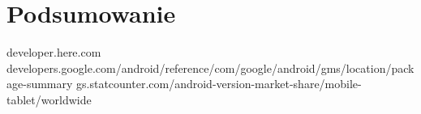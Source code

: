 \documentclass[10pt,twoside,a4paper]{report}
\begin{document}
\chapter{Podsumowanie}

\begin{thebibliography}{1}
   developer.here.com
   developers.google.com/android/reference/com/google/android/gms/location/package-summary
   gs.statcounter.com/android-version-market-share/mobile-tablet/worldwide
\end{thebibliography}

\listoffigures
\listoftables
\end{document}

